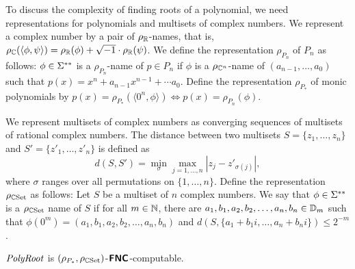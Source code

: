 \documentclass[envcountsame,orivec,oribibl]{llncs}
\begin{document}
To discuss the complexity of finding roots of a polynomial,
we need representations for polynomials and multisets of complex numbers.
We represent a complex number by a pair of $\rho _\mathbb R$-names,
that is, $
 \rho_\mathbb C (\langle \phi, \psi \rangle) 
= 
 \rho _\mathbb R (\phi) + \sqrt{-1} \cdot \rho _\mathbb R (\psi)
$.  We define the representation $\rho_{P_n}$ of 
$P _n$ as follows: 
$\phi \in \Sigma ^{**}$ is a $\rho_{P_n}$-name of $p \in P_n$ 
if $\phi$ is a $\rho_{\mathbb C^n}$-name of $(a_{n-1}, \dots, a_0)$ 
such that $p(x) = x^n + a_{n-1}x^{n-1} + \cdots a_0$.
Define the representation $\rho_{P_*}$ of monic polynomials by
$p(x) = \rho_{P_*}(\langle 0^n, \phi \rangle) \iff p(x) = \rho_{P_n}(\phi)$.

We represent multisets of complex numbers as converging sequences of 
multisets of rational complex numbers.
The distance between two multisets $S = \{z_1, \dots, z_n\}$
and $S' = \{z'_1, \dots, z'_n\}$ is defined as
\begin{equation}
d(S, S') = \min_{\sigma} \max_{j = 1, \ldots, n}|z_j - z'_{\sigma(j)}|,
\end{equation}
where $\sigma$ ranges over all permutations on $\{1, \ldots, n\}$. 
Define the representation $\rho_{\mathbb C\mathrm{Set}}$ as follows:
Let $S$ be a multiset of $n$ complex numbers. 
We say that $\phi \in \Sigma ^{**}$ is a $\rho_{\mathbb C\mathrm{Set}}$ name of $S$ if
for all $m \in \mathbb N$, there are $a_1, b_1, a_2, b_2, \dots, a_n, b_n \in \mathbb D_m$
such that $\phi(0^m) = ( a_1, b_1, a_2, b_2, \dots, a_n, b_n )$
and $d(S, \{a_1 + b_1 i, \dots, a_n + b_n i\}) \le 2^{-m}$.


\begin{theorem}
 \label{theorem:finding-roots-is-in-NC}
 $\mathit{PolyRoot}$ is $(\rho_{P_*}, \rho_{\mathbb C\mathrm{Set}})$-$\text{\bfseries \sffamily \upshape FNC}$-computable.
\end{theorem}
\end{document}

